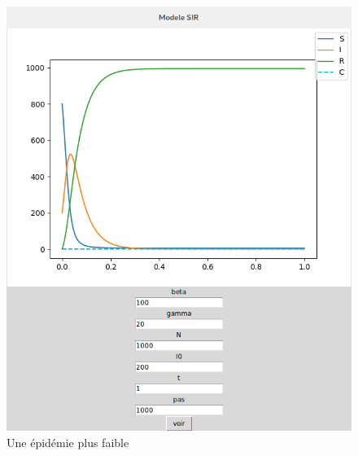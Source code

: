\documentclass[a4paper]{article}
\theoremstyle{plain}
\theoremstyle{definition}
\theoremstyle{remark}
\begin{document}
\begin{figure}[h]
\begin{minipage}[c]{.46\linewidth}
        \includegraphics{faible_ep.png}
        \caption{Une épidémie plus faible}
    \end{minipage}
\end{figure}
\end{document}
